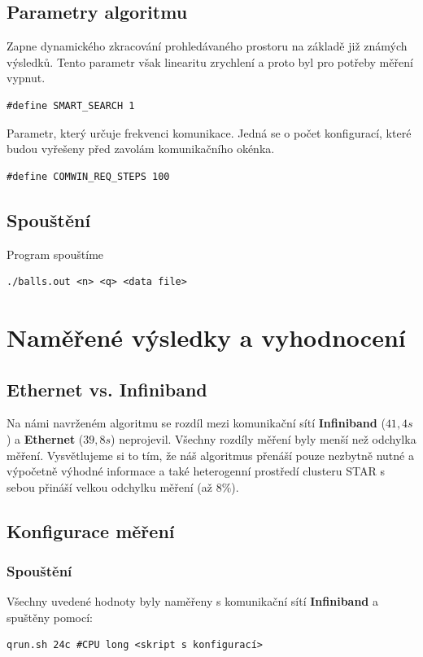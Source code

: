\documentclass[12pt,a4paper]{article}
\begin{document}
\medskip

\subsection{Parametry algoritmu}
Zapne dynamického zkracování prohledávaného prostoru na základě již známých výsledků. Tento parametr však  linearitu zrychlení a proto byl pro potřeby měření vypnut.
\begin{verbatim}
#define SMART_SEARCH 1
\end{verbatim}

\bigskip

Parametr, který určuje frekvenci komunikace. Jedná se o počet konfigurací, které budou vyřešeny před zavolám komunikačního okénka.
\begin{verbatim}
#define COMWIN_REQ_STEPS 100
\end{verbatim}

\medskip

\subsection{Spouštění}
Program spouštíme
\begin{verbatim}
./balls.out <n> <q> <data file>
\end{verbatim}

\section{Naměřené výsledky a vyhodnocení}

\subsection{Ethernet vs. Infiniband}
Na námi navrženém algoritmu se rozdíl mezi komunikační sítí \textbf{Infiniband} ($41,4s$) a \textbf{Ethernet} ($39,8s$) neprojevil. Všechny rozdíly měření byly menší než odchylka měření. Vysvětlujeme si to tím, že náš algoritmus přenáší pouze nezbytně nutné a výpočetně výhodné informace a také heterogenní prostředí clusteru STAR s sebou přináší velkou odchylku měření (až $ 8\% $).\\

\subsection{Konfigurace měření}

\subsubsection{Spouštění}
Všechny uvedené hodnoty byly naměřeny s komunikační sítí \textbf{Infiniband} a spuštěny pomocí:\\
\begin{verbatim}
qrun.sh 24c #CPU long <skript s konfigurací>
\end{verbatim}
\end{document}
